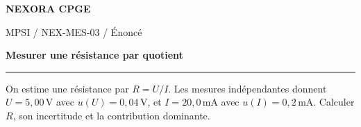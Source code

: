 \documentclass[11pt,a4paper]{article}
\begin{document}
{\small\bfseries\color{nexorablue} NEXORA CPGE}\par
{\small MPSI / NEX-MES-03 / Énoncé}\par
{\LARGE\bfseries Mesurer une résistance par quotient}\par
\vspace{0.25em}\hrule\vspace{0.6em}

On estime une résistance par $R=U/I$. Les mesures indépendantes donnent $U=5{,}00\,\mathrm V$ avec $u(U)=0{,}04\,\mathrm V$, et $I=20{,}0\,\mathrm{mA}$ avec $u(I)=0{,}2\,\mathrm{mA}$. Calculer $R$, son incertitude et la contribution dominante.
\end{document}
